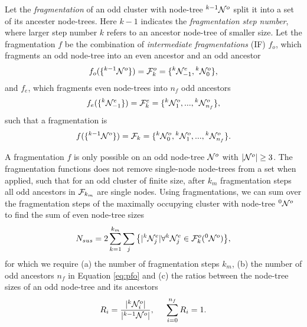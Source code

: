\begin{definition}\label{def:fragmentation}
  Let the \emph{fragmentation} of an odd cluster with node-tree ${}^{k-1}\mathcal{N}^o$ split it into a set of its ancester node-trees. Here $k-1$ indicates the \emph{fragmentation step number}, where larger step number $k$ refers to an ancestor node-tree of smaller size. Let the fragmentation $f$ be the combination of \emph{intermediate fragmentations} (IF) $f_o$, which fragments an odd node-tree into an even ancestor and an odd ancestor
  \begin{equation}\label{eq:pfe}
    f_o(\{\pre{k-1}\nset^o\}) = \m{F}^o_k = \{\pre{k}\nset^e_{-1}, \pre{k}\nset^o_0 \}, 
  \end{equation}
  and $f_e$, which fragments even node-trees into $n_f$ odd ancestors
  \begin{equation}\label{eq:pfo}
    f_e(\{\pre{k}\nset^e_{-1}\}) = \m{F}^e_k=\{\pre{k}\nset^{o}_1,...,\pre{k}\nset^o_{n_f}\},
  \end{equation}
  such that a fragmentation is
  \begin{equation}\label{eq:fstep}
    f(\{\pre{k-1}\nset^o\}) = \m{F}_k = \{\pre{k}\nset^o_0,\pre{k}\nset^{o}_1,...,\pre{k}\nset^{o}_{n_f}\}.
  \end{equation}
\end{definition}

A fragmentation $f$ is only possible on an odd node-tree $\mathcal{N}^o$ with $|{\mathcal{N}^o}| \geq 3$. The fragmentation functions does not remove single-node node-trees from a set when applied, such that for an odd cluster of finite size, after $k_m$ fragmentation steps all odd ancestors in $\mathcal{F}_{k_{m}}$ are single nodes. Using fragmentations, we can sum over the fragmentation steps of the maximally occupying cluster with node-tree ${}^{0}\mathcal{N}^o$ to find the sum of even node-tree sizes
\begin{equation}\label{eq:npdc}
  N_{sus} = 2\sum_{k=1}^{k_{m}}{ \sum_j{ \left\{ \abs{\pre{k}\nset_j^e} \forall \pre{k}\nset_j^e \in \m{F}^o_k(\pre{0}\nset^o)\right\} } },
\end{equation}
for which we require (a) the number of fragmentation steps $k_m$, (b) the number of odd ancestors $n_f$ in Equation \eqref{eq:pfo} and (c) the ratios between the node-tree sizes of an odd node-tree and its ancestors
\begin{equation}\label{eq:ratio}
  R_i = \frac{\abs{\pre{k}\nset^o_i}}{\abs{\pre{k-1}\nset^o}}, \hspace{0.5cm} \sum_{i=0}^{n_f}{R_i} = 1.
\end{equation}

